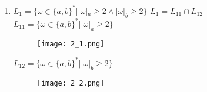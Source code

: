 \documentclass[12pt, a4paper]{article}
\begin{document}
\begin{enumerate}
    \item \(L_1=\{\omega\in\{a,b\}^* | |\omega|_a \geq 2 \wedge |\omega|_b \geq 2 \} \)
\(L_1=L_{11} \cap L_{12}\)
\\\(L_{11}=\{\omega\in\{a,b\}^* | |\omega|_a \geq 2 \} \)

\begin{comment}
digraph {
    rankdir="LR"
    "" [shape=point]
    q1 [shape=circle]
    q2 [shape=circle]
    q3 [shape=doublecircle]
    
    "" -> q1
    q1 -> q1 [label="b"]
    q1 -> q2 [label="a"]
    q2 -> q2 [label="b"]
    q2 -> q3 [label="a"]
    q3 -> q3 [label="a,b"]
}
\end{comment}

    \begin{figure}[H]
        \centering
        \texttt{[image: 2\_1.png]}
    \end{figure}
    
\(L_{12}=\{\omega\in\{a,b\}^* | |\omega|_b \geq 2 \} \)
\begin{comment}
digraph {
    rankdir="LR"
    "" [shape=point]
    q4 [shape=circle]
    q5 [shape=circle]
    q6 [shape=doublecircle]
    
    "" -> q4
    q4 -> q4 [label="a"]
    q4 -> q5 [label="b"]
    q5 -> q5 [label="a"]
    q5 -> q6 [label="b"]
    q6 -> q6 [label="a,b"]
}
\end{comment}

    \begin{figure}[H]
        \centering
        \texttt{[image: 2\_2.png]}
    \end{figure}


\end{enumerate}
\end{document}
